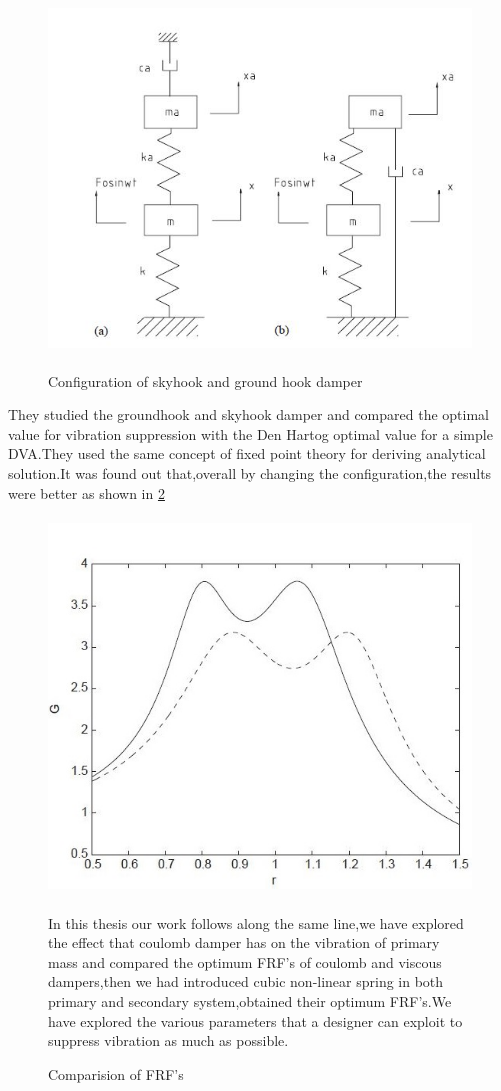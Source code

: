 \begin{enumerate}[i)]
\begin{figure}[h!]
\includegraphics[width=16cm,height=10cm]{"figures/8"}
\caption{Configuration of skyhook and ground hook damper}
  \label{fig:8}
\end{figure}
They studied the groundhook and skyhook damper and compared the optimal value for vibration suppression with the Den Hartog optimal value for a simple DVA.They used the same concept of fixed point theory for deriving analytical solution.It was found out that,overall by changing the configuration,the results were better as shown in \ref{fig:9}
\begin{figure}[h!]
\includegraphics[width=16cm,height=10cm]{"figures/9"}
\caption{Comparision of FRF's}
  \label{fig:9}
  In this thesis our work follows along the same line,we have explored the effect that coulomb damper has on the vibration of primary mass and compared the optimum FRF's of coulomb and viscous dampers,then we had introduced cubic non-linear spring in both primary and secondary system,obtained their optimum FRF's.We have explored the various parameters that a designer can exploit to suppress vibration as much as possible.
\end{figure}
\end{enumerate}

